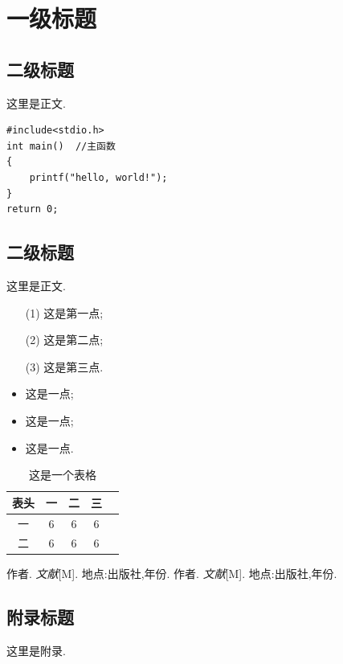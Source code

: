 \documentclass[12pt, a4paper, oneside]{ctexart}
\begin{document}
\newpage
\setcounter{page}{1}

\section{一级标题}

\subsection{二级标题}

这里是正文.
\begin{lstlisting}
#include<stdio.h>
int main()  //主函数
{
    printf("hello, world!");
}
return 0;
\end{lstlisting}

\subsection{二级标题}

这里是正文.

\begin{enumerate}
    \item[(1)] 这是第一点; 
    \item[(2)] 这是第二点;
    \item[(3)] 这是第三点. 
\end{enumerate}

\begin{itemize}
    \item 这是一点; 
    \item 这是一点;
    \item 这是一点. 
\end{itemize}

\newpage

\begin{table}[htbp]
    \caption{这是一个表格}
    \centering
    \begin{tabular}{|c|c|c|c|c|}
    \hline
    表头 & 一 & 二 & 三 \\ \hline
    一  & 6 & 6 & 6 \\ \hline
    二  & 6 & 6 & 6 \\ \hline
    \end{tabular}
\end{table}

\newpage

\begin{thebibliography}{99}
    作者. \emph{文献}[M]. 地点:出版社,年份.
    作者. \emph{文献}[M]. 地点:出版社,年份.
\end{thebibliography}

\newpage

\begin{appendices}
    \renewcommand{\thesection}{\Alph{section}}
    \section{附录标题}
        这里是附录. 
\end{appendices}
\end{document}
